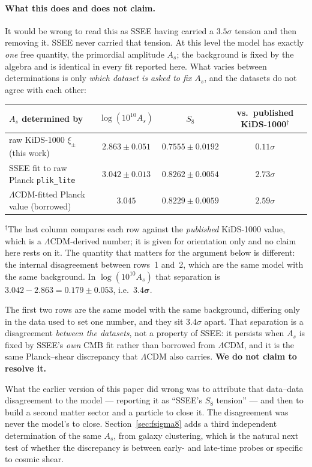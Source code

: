 \documentclass[12pt,a4paper]{article}
\newcommand{\SSEE}{\textsc{SSEE}}
\begin{document}
\paragraph{What this does and does not claim.} It would be wrong to read this
as \SSEE{} having carried a $3.5\sigma$ tension and then removing it.
\SSEE{} never carried that tension. At this level the model has
exactly \emph{one} free quantity, the primordial amplitude $A_s$; the
background is fixed by the algebra and is identical in every fit reported here.
What varies between determinations is only \emph{which dataset is asked to fix
$A_s$}, and the datasets do not agree with each other:

\begin{center}
\begin{tabular}{lccc}
\toprule
$A_s$ determined by & $\log(10^{10}A_s)$ & $S_8$ & vs.\ published KiDS-1000$^\dagger$ \\
\midrule
raw KiDS-1000 $\xi_\pm$ (this work) & $2.863\pm0.051$ & $0.7555\pm0.0192$ & $0.11\sigma$ \\
\SSEE{} fit to raw Planck \texttt{plik\_lite} & $3.042\pm0.013$ & $0.8262\pm0.0054$ & $2.73\sigma$ \\
$\Lambda$CDM-fitted Planck value (borrowed) & $3.045$ & $0.8229\pm0.0059$ & $2.59\sigma$ \\
\bottomrule
\end{tabular}

\smallskip
\footnotesize
$^\dagger$The last column compares each row against the \emph{published}
KiDS-1000 value, which is a $\Lambda$CDM-derived number; it is given for
orientation only and no claim here rests on it. The quantity that matters for
the argument below is different: the internal disagreement between rows~1
and~2, which are the same model with the same background. In
$\log(10^{10}A_s)$ that separation is $3.042-2.863=0.179\pm0.053$, i.e.\
$\mathbf{3.4\sigma}$.
\normalsize
\end{center}

The first two rows are the same model with the same background, differing only
in the data used to set one number, and they sit $3.4\sigma$ apart. That
separation is a disagreement \emph{between the datasets}, not a property of
\SSEE{}: it persists when $A_s$ is fixed by \SSEE{}'s \emph{own} CMB fit rather
than borrowed from $\Lambda$CDM, and it is the same Planck--shear discrepancy
that $\Lambda$CDM also carries. \textbf{We do not claim to resolve it.}

What the earlier version of this paper did wrong was to attribute that
data--data disagreement to the model --- reporting it as ``\SSEE{}'s $S_8$
tension'' --- and then to build a second matter sector and a particle to close
it. The disagreement was never the model's to close. Section~\ref{sec:fsigma8}
adds a third independent determination of the same $A_s$, from galaxy
clustering, which is the natural next test of whether the discrepancy is
between early- and late-time probes or specific to cosmic shear.
\end{document}
